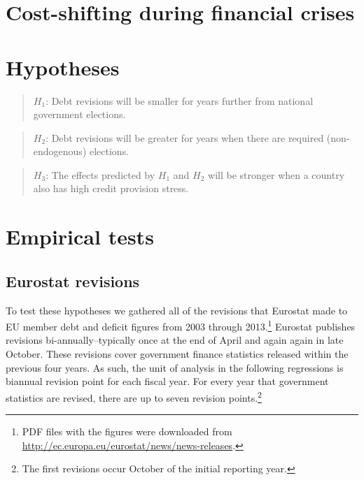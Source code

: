 \documentclass[]{article}
\begin{document}
\cite{DeCastro2013} \cite{Alt2014}

\section{Cost-shifting during financial crises}

\cite{GandrudHallerberg2016}

\section{Hypotheses}

\begin{quote}
    $H_{1}$: Debt revisions will be smaller for years further from national government elections.
\end{quote}

\begin{quote}
    $H_{2}$: Debt revisions will be greater for years when there are required (non-endogenous) elections.
\end{quote}

\begin{quote}
    $H_{3}$: The effects predicted by $H_{1}$ and $H_{2}$ will be stronger when a country also has high credit provision stress.
\end{quote}

\section{Empirical tests}

\subsection{Eurostat revisions}

To test these hypotheses we gathered all of the revisions that Eurostat made to EU member debt and deficit figures from 2003 through 2013.\footnote{PDF files with the figures were downloaded from \url{http://ec.europa.eu/eurostat/news/news-releases}.} Eurostat publishes revisions bi-annually--typically once at the end of April and again again in late October. These revisions cover government finance statistics released within the previous four years. As such, the unit of analysis in the following regressions is biannual revision point for each fiscal year. For every year that government statistics are revised, there are up to seven revision points.\footnote{The first revisions occur October of the initial reporting year.}
\end{document}
